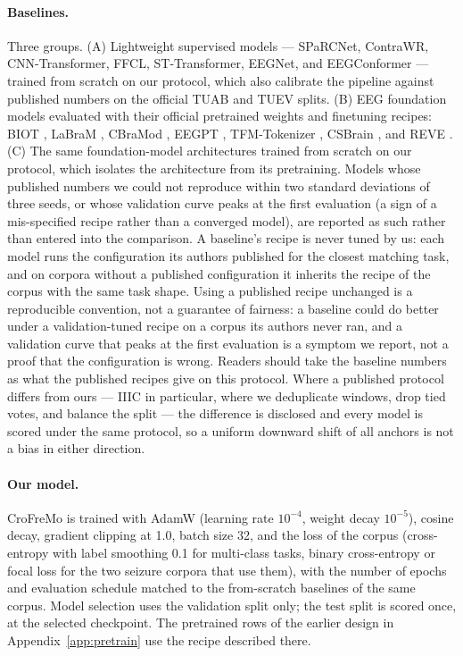 \paragraph{Baselines.}
Three groups. (A) Lightweight supervised models --- SPaRCNet, ContraWR,
CNN-Transformer, FFCL, ST-Transformer, EEGNet, and EEGConformer --- trained
from scratch on our protocol, which also calibrate the pipeline against
published numbers on the official TUAB and TUEV splits. (B) EEG foundation
models evaluated with their official pretrained weights and finetuning
recipes: BIOT \citep{yang2023biot}, LaBraM \citep{jiang2024labram}, CBraMod
\citep{wang2025cbramod}, EEGPT \citep{wang2024eegpt}, TFM-Tokenizer
\citep{pradeepkumar2026tfm}, CSBrain \citep{zhou2025csbrain}, and REVE
\citep{bertrand2025reve}. (C) The same foundation-model architectures
trained from scratch on our protocol, which isolates the architecture from
its pretraining. Models whose published numbers we could not reproduce
within two standard deviations of three seeds, or whose validation curve
peaks at the first evaluation (a sign of a mis-specified recipe rather than
a converged model), are reported as such rather than entered into the
comparison. A baseline's recipe is never tuned by us: each model runs the
configuration its authors published for the closest matching task, and on
corpora without a published configuration it inherits the recipe of the
corpus with the same task shape. Using a published recipe unchanged is a
reproducible convention, not a guarantee of fairness: a baseline could do
better under a validation-tuned recipe on a corpus its authors never ran,
and a validation curve that peaks at the first evaluation is a symptom we
report, not a proof that the configuration is wrong. Readers should take
the baseline numbers as what the published recipes give on this
protocol. Where a published protocol differs from
ours --- IIIC in particular, where we deduplicate windows, drop tied votes,
and balance the split --- the difference is disclosed and every model is
scored under the same protocol, so a uniform downward shift of all anchors
is not a bias in either direction.

\paragraph{Our model.}
CroFreMo is trained with AdamW (learning rate $10^{-4}$,
weight decay $10^{-5}$), cosine decay, gradient clipping at 1.0, batch
size 32, and the loss of the corpus (cross-entropy with label smoothing
0.1 for multi-class tasks, binary cross-entropy or focal loss for the two
seizure corpora that use them), with the number of epochs and evaluation
schedule matched to the from-scratch baselines of the same corpus. Model
selection uses the validation split only; the test split is scored once,
at the selected checkpoint. The pretrained rows of the earlier design in
Appendix~\ref{app:pretrain} use the recipe described there.


